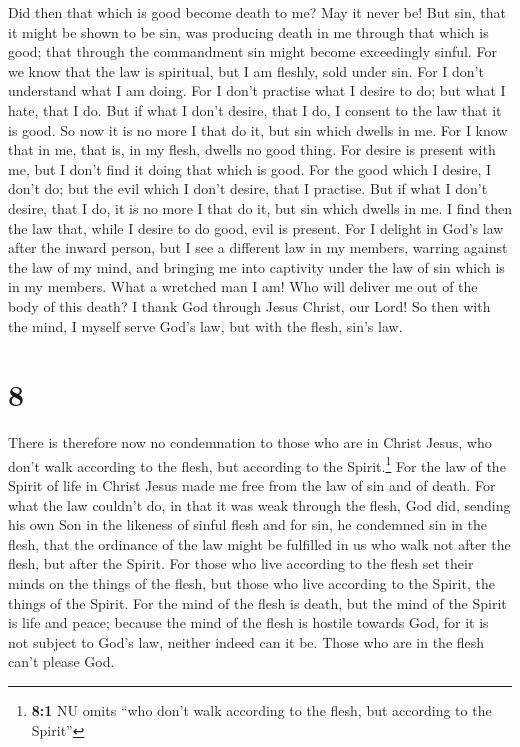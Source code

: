  Did then that which is good become death to me? May it
never be! But sin, that it might be shown to be sin, was producing death
in me through that which is good; that through the commandment sin might
become exceedingly sinful.  For we know that the law is
spiritual, but I am fleshly, sold under sin.  For I don't
understand what I am doing. For I don't practise what I desire to do;
but what I hate, that I do.  But if what I don't desire,
that I do, I consent to the law that it is good.  So now
it is no more I that do it, but sin which dwells in me. 
For I know that in me, that is, in my flesh, dwells no good thing. For
desire is present with me, but I don't find it doing that which is good.
 For the good which I desire, I don't do; but the evil
which I don't desire, that I practise.  But if what I
don't desire, that I do, it is no more I that do it, but sin which
dwells in me.  I find then the law that, while I desire
to do good, evil is present.  For I delight in God's law
after the inward person,  but I see a different law in my
members, warring against the law of my mind, and bringing me into
captivity under the law of sin which is in my members. 
What a wretched man I am! Who will deliver me out of the body of this
death?  I thank God through Jesus Christ, our Lord! So
then with the mind, I myself serve God's law, but with the flesh, sin's
law.

\hypertarget{section-7}{%
\section{8}\label{section-7}}

 There is therefore now no condemnation to those who are
in Christ Jesus, who don't walk according to the flesh, but according to
the Spirit.\footnote{\textbf{8:1} NU omits ``who don't walk according to
  the flesh, but according to the Spirit''}  For the law
of the Spirit of life in Christ Jesus made me free from the law of sin
and of death.  For what the law couldn't do, in that it
was weak through the flesh, God did, sending his own Son in the likeness
of sinful flesh and for sin, he condemned sin in the flesh,
 that the ordinance of the law might be fulfilled in us
who walk not after the flesh, but after the Spirit.  For
those who live according to the flesh set their minds on the things of
the flesh, but those who live according to the Spirit, the things of the
Spirit.  For the mind of the flesh is death, but the mind
of the Spirit is life and peace;  because the mind of the
flesh is hostile towards God, for it is not subject to God's law,
neither indeed can it be.  Those who are in the flesh
can't please God.

